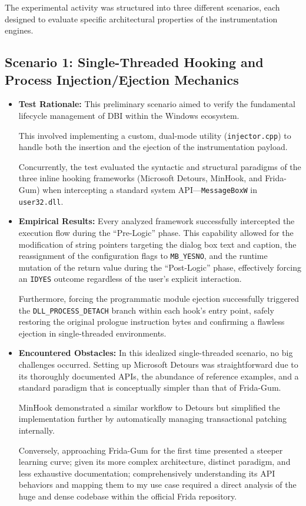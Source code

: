 The experimental activity was structured into three different scenarios, each designed to evaluate specific architectural properties of the instrumentation engines.

\subsection{Scenario 1: Single-Threaded Hooking and Process Injection/Ejection Mechanics}
\label{subsec:scenario_1}

\begin{itemize}
	\item \textbf{Test Rationale:} This preliminary scenario aimed to verify the fundamental lifecycle management of \ac{DBI} within the Windows ecosystem. 
	
	This involved implementing a custom, dual-mode utility (\texttt{injector.cpp}) to handle both the insertion and the ejection of the instrumentation payload. 
	
	Concurrently, the test evaluated the syntactic and structural paradigms of the three inline hooking frameworks (Microsoft Detours, MinHook, and Frida-Gum) when intercepting a standard system API—\texttt{MessageBoxW} in \texttt{user32.dll}.
	
	\item \textbf{Empirical Results:} Every analyzed framework successfully intercepted the execution flow during the ``Pre-Logic'' phase. This capability allowed for the modification of string pointers targeting the dialog box text and caption, the reassignment of the configuration flags to \texttt{MB\_YESNO}, and the runtime mutation of the return value during the ``Post-Logic'' phase, effectively forcing an \texttt{IDYES} outcome regardless of the user's explicit interaction. 
	
	Furthermore, forcing the programmatic module ejection successfully triggered the \texttt{DLL\_PROCESS\_DETACH} branch within each hook's entry point, safely restoring the original prologue instruction bytes and confirming a flawless ejection in single-threaded environments.
	
	\item \textbf{Encountered Obstacles:} In this idealized single-threaded scenario, no big challenges occurred. Setting up Microsoft Detours was straightforward due to its thoroughly documented APIs, the abundance of reference examples, and a standard paradigm that is conceptually simpler than that of Frida-Gum. 
	
	MinHook demonstrated a similar workflow to Detours but simplified the implementation further by automatically managing transactional patching internally. 
	
	Conversely, approaching Frida-Gum for the first time presented a steeper learning curve; given its more complex architecture, distinct paradigm, and less exhaustive documentation; comprehensively understanding its API behaviors and mapping them to my use case required a direct analysis of the huge and dense codebase within the official Frida repository.
\end{itemize}

